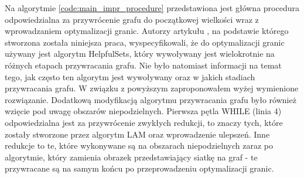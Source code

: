 \vspace{-8mm}
\label{code:main_impr_procedure}
\vspace{4mm}
Na algorytmie \ref{code:main_impr_procedure}
przedstawiona jest główna procedura odpowiedzialna za przywrócenie grafu do
początkowej wielkości wraz z wprowadzaniem optymalizacji granic.
Autorzy artykułu \cite{1364754}, na podstawie którego stworzona została niniejsza praca, wyspecyfikowali, że
do optymalizacji granic używany jest algorytm HelpfulSets, który
wywoływany jest wielokrotnie na różnych etapach przywracania grafu.
Nie było natomiast informacji na temat tego, jak często ten algorytm jest wywoływany oraz w jakich stadiach przywracania grafu.
W związku z powyższym zaproponowałem wyżej wymienione rozwiązanie.
Dodatkową modyfikacją algorytmu przywracania grafu było również wzięcie pod uwagę obszarów niepodzielnych.
Pierwsza pętla WHILE (linia $4$) odpowiedzialna jest za przywrócenie zwykłych
redukcji, to znaczy tych, które zostały stworzone przez algorytm LAM oraz wprowadzenie ulepszeń.
Inne redukcje to te, które wykonywane są na obszarach niepodzielnych zaraz po
algorytmie, który zamienia obrazek przedstawiający siatkę na graf - te przywracane są na samym końcu po przeprowadzeniu
optymalizacji granic.

